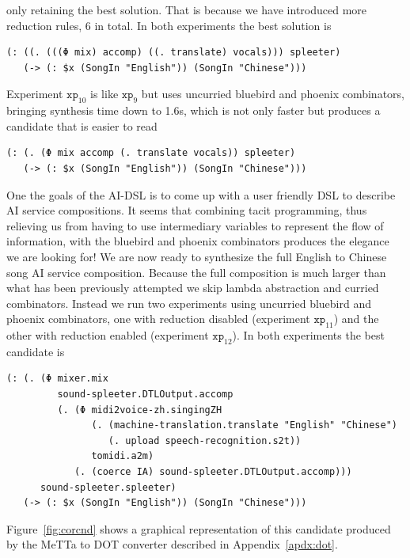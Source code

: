 \documentclass[]{report}
\begin{document}
only retaining the best solution.  That is because we have introduced
more reduction rules, 6 in total.  In both experiments the best
solution is
\begin{verbatim}
(: ((. (((Φ mix) accomp) ((. translate) vocals))) spleeter)
   (-> (: $x (SongIn "English")) (SongIn "Chinese")))
\end{verbatim}
Experiment $\texttt{xp}_{10}$ is like $\texttt{xp}_9$ but uses
uncurried bluebird and phoenix combinators, bringing synthesis time
down to 1.6s, which is not only faster but produces a candidate that
is easier to read
\begin{verbatim}
(: (. (Φ mix accomp (. translate vocals)) spleeter)
   (-> (: $x (SongIn "English")) (SongIn "Chinese")))
\end{verbatim}
One the goals of the AI-DSL is to come up with a user friendly DSL to
describe AI service compositions.  It seems that combining tacit
programming, thus relieving us from having to use intermediary
variables to represent the flow of information, with the bluebird and
phoenix combinators produces the elegance we are looking for!  We are
now ready to synthesize the full English to Chinese song AI service
composition.  Because the full composition is much larger than what
has been previously attempted we skip lambda abstraction and curried
combinators.  Instead we run two experiments using uncurried bluebird
and phoenix combinators, one with reduction disabled (experiment
$\texttt{xp}_{11}$) and the other with reduction enabled (experiment
$\texttt{xp}_{12}$).  In both experiments the best candidate is
\begin{small}
\begin{verbatim}
(: (. (Φ mixer.mix
         sound-spleeter.DTLOutput.accomp
         (. (Φ midi2voice-zh.singingZH
               (. (machine-translation.translate "English" "Chinese")
                  (. upload speech-recognition.s2t))
               tomidi.a2m)
            (. (coerce IA) sound-spleeter.DTLOutput.accomp)))
      sound-spleeter.spleeter)
   (-> (: $x (SongIn "English")) (SongIn "Chinese")))
\end{verbatim}
\end{small}
Figure~\ref{fig:corcnd} shows a graphical representation of this candidate
produced by the MeTTa to DOT converter described in
Appendix~\ref{apdx:dot}.
\end{document}
